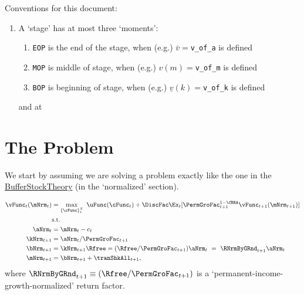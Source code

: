 \documentclass[\econtexRoot/BufferStockTheory]{subfiles}
\newcommand{\EOP}{\bar}
\newcommand{\MOP}{}
\newcommand{\BOP}{\underline}
\begin{document}


\hypertarget{ApndxSolutionSteps}{}

Conventions for this document:
\begin{enumerate}
\item A `stage' has at most three `moments':
  \begin{enumerate}
  \item \texttt{EOP} is the end of the stage, when (e.g.) $\EOP{v}=$\texttt{v\_of\_a} is defined
  \item \texttt{MOP} is middle of stage, when (e.g.) $\MOP{v}(m)=$\texttt{v\_of\_m} is defined
  \item \texttt{BOP} is beginning of stage, when (e.g.) $\BOP{v}(k)=$\texttt{v\_of\_k} is defined
  \end{enumerate}

  and at 

\end{enumerate}


\section{The Problem}

We start by assuming we are solving a problem exactly like the one in the \href{https://econ-ark.github.io/BufferStockTheory}{BufferStockTheory} (in the `normalized' section).

\begin{equation*}\label{eq:veqn}
  \begin{split}
    \vFunc_{t}(\mNrm_{t})  & = \max_{{\{\cFunc\}}_{t}^{T}}~  \uFunc(\cFunc_{t}) +\DiscFac \Ex_{t}[\PermGroFac_{t+1}^{1-\CRRA}\vFunc_{t+1}({\mNrm}_{t+1})]  \\
    & \mbox{s.t.}
    \\ {\aNrm}_{t}  & = \mNrm_{t}-c_{t}
    \\ {\kNrm}_{t+1} & = \aNrm_{t}/\PermGroFac_{t+1}
    \\ {\bNrm}_{t+1}  & = {\kNrm}_{t+1}\Rfree = (\Rfree/\PermGroFac_{t+1})\aNrm_{t}  ~ = ~ \RNrmByGRnd_{t+1}\aNrm_{t}
    \\ \mNrm_{t+1}  & = \bNrm_{t+1}+\tranShkAll_{t+1}  ,
  \end{split}
\end{equation*}
where $\RNrmByGRnd_{t+1}\equiv (\Rfree/\PermGroFac_{t+1})$ is a `permanent-income-growth-normalized' return factor.
\end{document}
